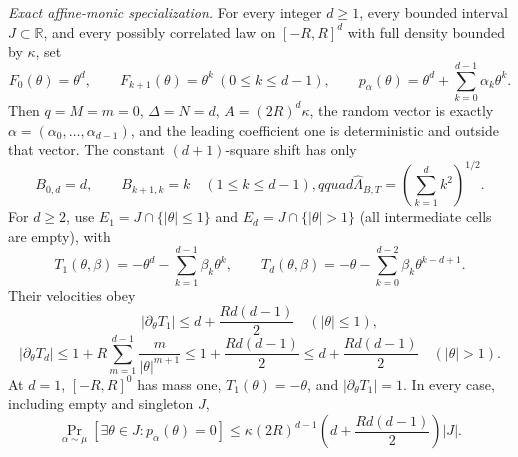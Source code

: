 \begin{theorem}
\emph{Exact affine-monic specialization.} For every integer $d\geq1$, every bounded interval
$J\subset\mathbb R$, and every possibly correlated law on $[-R,R]^d$ with full density bounded by $\kappa$,
set
\begin{equation}
\label{eq:main-display-009}
F_0(\theta)=\theta^d,\qquad F_{k+1}(\theta)=\theta^k\ (0\leq k\leq d-1),\qquad
p_\alpha(\theta)=\theta^d+\sum_{k=0}^{d-1}\alpha_k\theta^k.
\end{equation}
Then $q=M=m=0$, $\Delta=N=d$, $A=(2R)^d\kappa$, the random vector is exactly
$\alpha=(\alpha_0,\ldots,\alpha_{d-1})$, and the leading coefficient one is deterministic and outside that
vector. The constant $(d+1)$-square shift has only
\begin{equation}
\label{eq:main-display-010}
B_{0,d}=d,\qquad B_{k+1,k}=k\quad(1\leq k\leq d-1),qquad
\widehat\Lambda_{B,T}=\left(\sum_{k=1}^d k^2\right)^{1/2}.
\end{equation}
For $d\geq2$, use $E_1=J\cap\{|\theta|\leq1\}$ and
$E_d=J\cap\{|\theta|>1\}$ (all intermediate cells are empty), with
\begin{equation}
\label{eq:main-display-011}
T_1(\theta,\beta)=-\theta^d-\sum_{k=1}^{d-1}\beta_k\theta^k,
\qquad
T_d(\theta,\beta)=-\theta-\sum_{k=0}^{d-2}\beta_k\theta^{k-d+1}.
\end{equation}
Their velocities obey
\begin{equation}
\label{eq:main-display-012}
|\partial_\theta T_1|\leq d+\frac{Rd(d-1)}2\quad(|\theta|\leq1),
\end{equation}
\begin{equation}
\label{eq:main-display-013}
|\partial_\theta T_d|\leq1+R\sum_{m=1}^{d-1}\frac{m}{|\theta|^{m+1}}
\leq1+\frac{Rd(d-1)}2\leq d+\frac{Rd(d-1)}2\quad(|\theta|>1).
\end{equation}
At $d=1$, $[-R,R]^0$ has mass one, $T_1(\theta)=-\theta$, and
$|\partial_\theta T_1|=1$. In every case, including empty and singleton $J$,
\begin{equation}
\label{eq:main-display-014}
\Pr_{\alpha\sim\mu}[\exists\theta\in J:p_\alpha(\theta)=0]
\leq\kappa(2R)^{d-1}\left(d+\frac{Rd(d-1)}2\right)|J|.
\end{equation}


\end{theorem}
